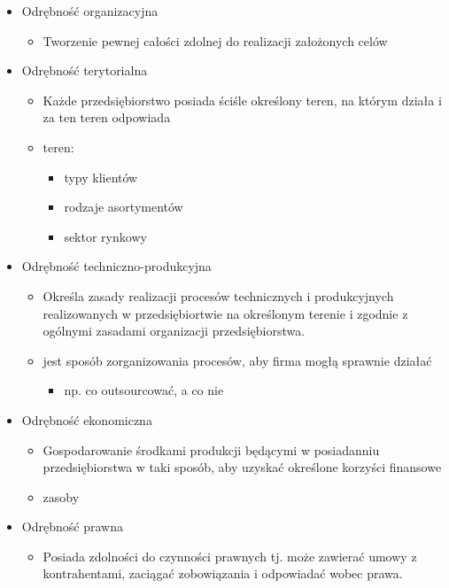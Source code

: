 \documentclass[a4paper,10pt]{report}
\begin{document}
\begin{itemize}
	\item Odrębność organizacyjna
	\begin{itemize}
		\item Tworzenie pewnej całości zdolnej do realizacji założonych celów
	\end{itemize}
	\item Odrębność terytorialna
	\begin{itemize}
		\item Każde przedsiębiorstwo posiada ściśle określony teren, na którym działa i za ten teren odpowiada
		\item teren:
		\begin{itemize}
			\item typy klientów
			\item rodzaje asortymentów
			\item sektor rynkowy
		\end{itemize}
	\end{itemize}
	\item Odrębność techniczno-produkcyjna
	\begin{itemize}
		\item Określa zasady realizacji procesów technicznych i produkcyjnych realizowanych w przedsiębiortwie na określonym terenie i zgodnie z ogólnymi zasadami organizacji przedsiębiorstwa.
		\item jest sposób zorganizowania procesów, aby firma mogłą sprawnie działać
		\begin{itemize}
			\item np. co outsourcować, a co nie
		\end{itemize}
	\end{itemize} 
	\item Odrębność ekonomiczna
	\begin{itemize}
		\item Gospodarowanie środkami produkcji będącymi w posiadanniu przedsiębiorstwa w taki sposób, aby uzyskać określone korzyści finansowe
		\item zasoby
	\end{itemize}
	\item Odrębność prawna
	\begin{itemize}
		\item Posiada zdolności do czynności prawnych tj. może zawierać umowy z kontrahentami, zaciągać zobowiązania i odpowiadać wobec prawa.
	\end{itemize}
\end{itemize}
\end{document}
